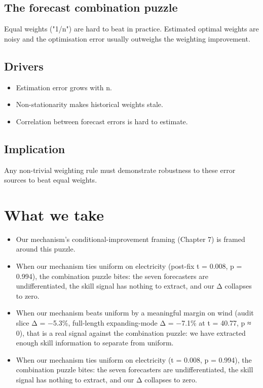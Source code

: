 \documentclass[11pt,a4paper,openany]{report}
\begin{document}
\subsection{The forecast combination puzzle}

Equal weights ("1/n") are hard to beat in practice. Estimated optimal
weights are noisy and the optimisation error usually outweighs the
weighting improvement.

\subsection{Drivers}

\begin{itemize}
  \item Estimation error grows with n.
  \item Non-stationarity makes historical weights stale.
  \item Correlation between forecast errors is hard to estimate.
\end{itemize}

\subsection{Implication}

Any non-trivial weighting rule must demonstrate robustness to these
error sources to beat equal weights.

\section{What we take}

\begin{itemize}
  \item Our mechanism's conditional-improvement framing (Chapter 7) is
    framed around this puzzle.
  \item When our mechanism ties uniform on electricity (post-fix t = 0.008,
    p = 0.994), the combination puzzle bites: the seven forecasters
    are undifferentiated, the skill signal has nothing to extract, and
    our Δ collapses to zero.
  \item When our mechanism beats uniform by a meaningful margin on wind
    (audit slice Δ = −5.3\%, full-length expanding-mode Δ = −7.1\% at
    t = 40.77, p ≈ 0), that is a real signal against the combination
    puzzle: we have extracted enough skill information to separate
    from uniform.
  \item When our mechanism ties uniform on electricity (t = 0.008,
    p = 0.994), the combination puzzle bites: the seven forecasters
    are undifferentiated, the skill signal has nothing to extract, and
    our Δ collapses to zero.
\end{itemize}
\end{document}
